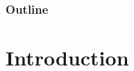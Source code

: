 \documentclass{beamer}
\begin{document}

\begin{frame}
\titlepage
\end{frame}

\begin{frame}
\frametitle{Outline}
\tableofcontents
\end{frame}

\section{Introduction}

\begin{frame}{}
    \tableofcontents[currentsection]
\end{frame}




\end{document}
